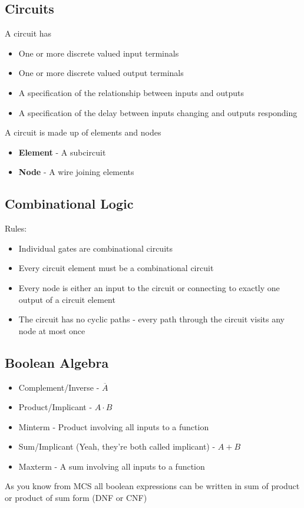 \documentclass{article}[18pt]
\begin{document}
\subsection{Circuits}
A circuit has
\begin{itemize}
	\item One or more discrete valued input terminals
	\item One or more discrete valued output terminals
	\item A specification of the relationship between inputs and outputs
	\item A specification of the delay between inputs changing and outputs responding
\end{itemize}
A circuit is made up of elements and nodes
\begin{itemize}
	\item \textbf{Element} - A subcircuit
	\item \textbf{Node} - A wire joining elements
\end{itemize}
\subsection{Combinational Logic}
Rules:
\begin{itemize}
	\item Individual gates are combinational circuits
	\item Every circuit element must be a combinational circuit
	\item Every node is either an input to the circuit or connecting to exactly one output of a circuit element
	\item The circuit has no cyclic paths - every path through the circuit visits any node at most once
\end{itemize}
\subsection{Boolean Algebra}
\begin{itemize}
	\item Complement/Inverse - $\overline{A}$
	\item Product/Implicant - $A\cdot B$
	\item Minterm - Product involving all inputs to a function
	\item Sum/Implicant (Yeah, they're both called implicant) - $A+B$
	\item Maxterm - A sum involving all inputs to a function
\end{itemize}
As you know from MCS all boolean expressions can be written in sum of product or product of sum form (DNF or CNF)
\end{document}
